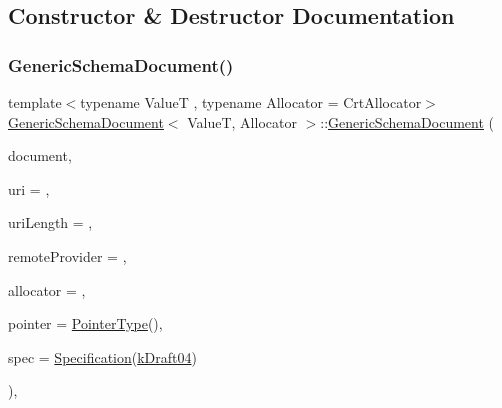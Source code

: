 \subsection{Constructor \& Destructor Documentation}
\mbox{\label{classGenericSchemaDocument_a00e74506bb3da4e1c82b62c955f717f6}} 
\subsubsection{\texorpdfstring{Generic\+Schema\+Document()}{GenericSchemaDocument()}\hspace{0.1cm}{\footnotesize\ttfamily [1/2]}}
{\footnotesize\ttfamily template$<$typename ValueT , typename Allocator  = Crt\+Allocator$>$ \\
\hyperlink{classGenericSchemaDocument}{Generic\+Schema\+Document}$<$ ValueT, Allocator $>$\+::\hyperlink{classGenericSchemaDocument}{Generic\+Schema\+Document} (\begin{DoxyParamCaption}\item[{const \hyperlink{classGenericSchemaDocument_ae246f1b6573a5a8a2c0d73d4eb64d53a}{Value\+Type} \&}]{document,  }\item[{const \hyperlink{classGenericSchemaDocument_ab1dec56a78b29649eb8e4b85b101ec7c}{Ch} $\ast$}]{uri = {},  }\item[{\hyperlink{rapidjson_8h_a5ed6e6e67250fadbd041127e6386dcb5}{Size\+Type}}]{uri\+Length = {},  }\item[{\hyperlink{classGenericSchemaDocument_aa53ca323efce50f88aea6fa0d03e9785}{I\+Remote\+Schema\+Document\+Provider\+Type} $\ast$}]{remote\+Provider = {},  }\item[{Allocator $\ast$}]{allocator = {},  }\item[{const \hyperlink{classGenericSchemaDocument_aeb62f562d4dc024402b00f97cbcef747}{Pointer\+Type} \&}]{pointer = {\ttfamily \hyperlink{classGenericSchemaDocument_aeb62f562d4dc024402b00f97cbcef747}{Pointer\+Type}()},  }\item[{const \hyperlink{structSpecification}{Specification} \&}]{spec = {\ttfamily \hyperlink{structSpecification}{Specification}(\hyperlink{schema_8h_a9804f9d7d7bd63131facb12bbeed41a9aa83888819bf813bd89c4c50f8c3275e4}{k\+Draft04})} }\end{DoxyParamCaption})\hspace{0.3cm}{\ttfamily [inline]}, {\ttfamily [explicit]}}




